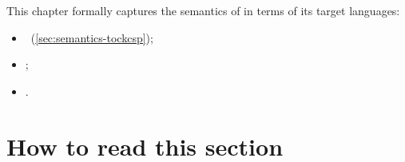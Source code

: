 \newcommand{\field}[2]{#1.\funcname{#2}}

This chapter formally captures the semantics of \langname{} in terms of its
target languages:

\begin{itemize}
\item
	\tockcsp~(\cref{sec:semantics-tockcsp});
\item
	;
\item
	.
\end{itemize}

\section{How to read this section}

\begin{table}
	\centering


\end{table}
